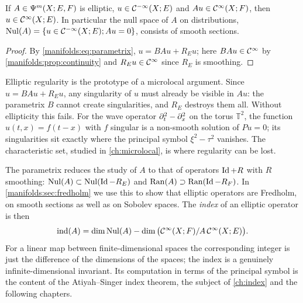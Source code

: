 \begin{corollary}\label{manifolds:cor:regularity}
If $A\in\Psi^{m}(X;E,F)$ is elliptic, $u\in\mathcal{C}^{-\infty}(X;E)$ and $Au\in\mathcal{C}^\infty(X;F)$, then
$u\in\mathcal{C}^\infty(X;E)$. In particular the null space of $A$ on distributions,
$\operatorname{Nul}(A)=\{u\in\mathcal{C}^{-\infty}(X;E);Au=0\}$, consists of smooth sections.
\end{corollary}
\begin{proof}
By \eqref{manifolds:eq:parametrix}, $u=BAu+R_Eu$; here $BAu\in\mathcal{C}^\infty$ by
\cref{manifolds:prop:continuity} and $R_Eu\in\mathcal{C}^\infty$ since $R_E$ is smoothing.
\end{proof}

\begin{discussion}
Elliptic regularity is the prototype of a microlocal argument. Since
$u=BAu+R_Eu$, any singularity of $u$ must already be visible in $Au$: the
parametrix $B$ cannot create singularities, and $R_E$ destroys them all.
Without ellipticity this fails. For the wave operator $\partial_t^2-\partial_x^2$ on the
torus $\mathbb T^2$, the function $u(t,x)=f(t-x)$ with $f$ singular is a
non-smooth solution of $Pu=0$; its singularities sit exactly where the
principal symbol $\xi^2-\tau^2$ vanishes. The characteristic set, studied in
\cref{ch:microlocal}, is where regularity can be lost.
\end{discussion}

The parametrix reduces the study of $A$ to that of operators $\operatorname{Id}+R$ with $R$
smoothing: $\operatorname{Nul}(A)\subset\operatorname{Nul}(\operatorname{Id}-R_E)$ and $\operatorname{Ran}(A)\supset\operatorname{Ran}(\operatorname{Id}-R_F)$. In
\cref{manifolds:sec:fredholm} we use this to show that elliptic operators are
Fredholm, on smooth sections as well as on Sobolev spaces. The \emph{index}
of an elliptic operator is then
\begin{equation}\label{manifolds:eq:index}
\operatorname{ind}(A)=\dim\operatorname{Nul}(A)-\dim\big(\mathcal{C}^\infty(X;F)/A\,\mathcal{C}^\infty(X;E)\big).
\end{equation}
For a linear map between finite-dimensional spaces the corresponding integer is
just the difference of the dimensions of the spaces; the index is a genuinely
infinite-dimensional invariant. Its computation in terms of the principal symbol
is the content of the Atiyah--Singer index theorem, the subject of
\cref{ch:index} and the following chapters.

